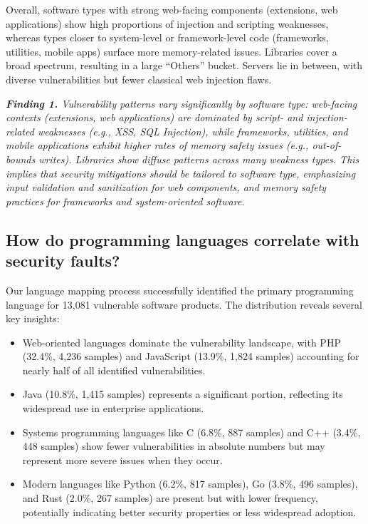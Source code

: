 Overall, software types with strong web-facing components (extensions, web applications) show high proportions of injection and scripting weaknesses, whereas types closer to system-level or framework-level code (frameworks, utilities, mobile apps) surface more memory-related issues. Libraries cover a broad spectrum, resulting in a large “Others” bucket. Servers lie in between, with diverse vulnerabilities but fewer classical web injection flaws.

\begin{boxC}
\textit{\textbf{Finding 1.} Vulnerability patterns vary significantly by software type: web-facing contexts (extensions, web applications) are dominated by script- and injection-related weaknesses (e.g., XSS, SQL Injection), while frameworks, utilities, and mobile applications exhibit higher rates of memory safety issues (e.g., out-of-bounds writes). Libraries show diffuse patterns across many weakness types. This implies that security mitigations should be tailored to software type, emphasizing input validation and sanitization for web components, and memory safety practices for frameworks and system-oriented software.}
\end{boxC}

\subsection{How do programming languages correlate with security faults?}

Our language mapping process successfully identified the primary programming language for 13,081 vulnerable software products. The distribution reveals several key insights:

\begin{itemize}
    \item Web-oriented languages dominate the vulnerability landscape, with PHP (32.4\%, 4,236 samples) and JavaScript (13.9\%, 1,824 samples) accounting for nearly half of all identified vulnerabilities.
    \item Java (10.8\%, 1,415 samples) represents a significant portion, reflecting its widespread use in enterprise applications.
    \item Systems programming languages like C (6.8\%, 887 samples) and C++ (3.4\%, 448 samples) show fewer vulnerabilities in absolute numbers but may represent more severe issues when they occur.
    \item Modern languages like Python (6.2\%, 817 samples), Go (3.8\%, 496 samples), and Rust (2.0\%, 267 samples) are present but with lower frequency, potentially indicating better security properties or less widespread adoption.
\end{itemize}


